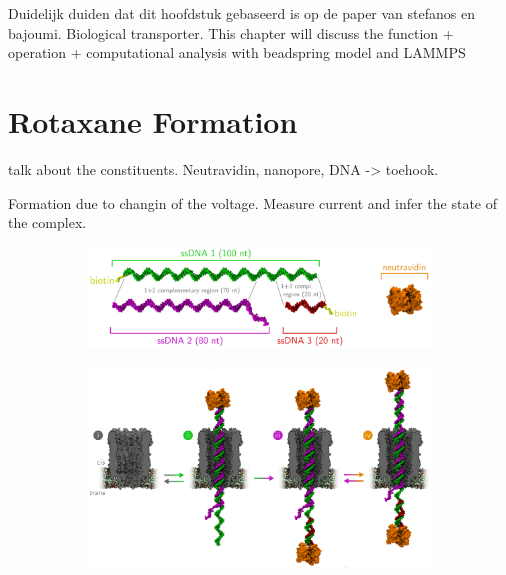 Duidelijk duiden dat dit hoofdstuk gebaseerd is op de paper van stefanos en bajoumi.
Biological transporter. This chapter will discuss the function + operation +
computational analysis with beadspring model and LAMMPS

\section{Rotaxane Formation}


talk about the constituents. Neutravidin, nanopore, DNA -> toehook.

Formation due to changin of the voltage. Measure current and infer the state of the
complex.





\begin{figure}[ht]
  \begin{centering}
  \begin{subfigure}[t]{\dimexpr.8\linewidth-1.3em\relax}
  \centering
  \includegraphics[width=\linewidth,valign=t]{Figures/RConstruction1.png}
  \end{subfigure}%
  \vspace{0.5cm}
  \begin{subfigure}[t]{\dimexpr.8\linewidth-1.3em\relax}
  \centering
  \includegraphics[width=\linewidth,valign=t]{Figures/RConstruction2.png}

\end{subfigure}
\end{centering}
\end{figure}

